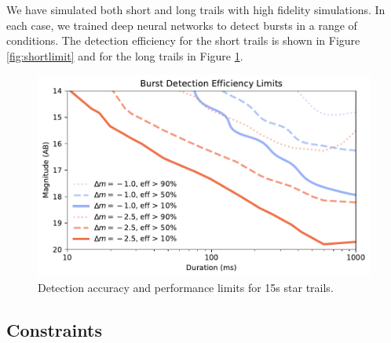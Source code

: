 \documentclass[12pt, letterpaper]{article}
\begin{document}
We have simulated both short and long trails with high fidelity simulations. In each case, we trained deep neural networks to detect bursts in a range of conditions. The detection efficiency for the short trails is shown in Figure \ref{fig:shortlimit} and for the long trails in Figure \ref{fig:longlimit}. 

\begin{figure}[htb!]
\center
\includegraphics{f7.pdf}
\caption{Detection accuracy and performance limits for 15s star trails.}
\label{fig:longlimit}
\end{figure}

\subsection{Constraints}
\end{document}
